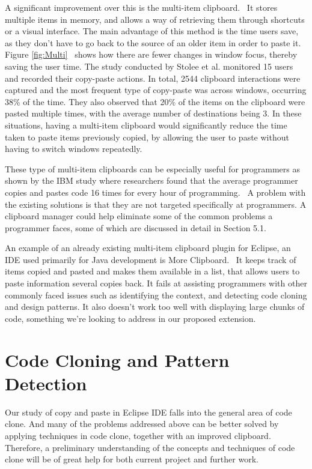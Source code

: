 \documentclass{acm_proc_article-sp}
\begin{document}
A significant improvement over this is the multi-item clipboard.~\cite{cpHabits} It stores multiple items in memory, and allows a way of retrieving them through shortcuts or a visual interface. The main advantage of this method is the time users save, as they don't have to go back to the source of an older item in order to paste it. Figure \ref{fig:Multi}~\cite{cpHabits} shows how there are fewer changes in window focus, thereby saving the user time. The study conducted by Stolee et al. monitored 15 users and recorded their copy-paste actions. In total, 2544 clipboard interactions were captured and the most frequent type of copy-paste was across windows, occurring 38\% of the time. They also observed that 20\% of the items on the clipboard were pasted multiple times, with the average number of destinations being 3. In these situations, having a multi-item clipboard would significantly reduce the time taken to paste items previously copied, by allowing the user to paste without having to switch windows repeatedly.

These type of multi-item clipboards can be especially useful for programmers as shown by the IBM study where researchers found that the average programmer copies and pastes code 16 times for every hour of programming.~\cite{ooplCP} A problem with the existing solutions is that they are not targeted specifically at programmers. A clipboard manager could help eliminate some of the common problems a programmer faces, some of which are discussed in detail in Section 5.1.

An example of an already existing multi-item clipboard plugin for Eclipse, an IDE used primarily for Java development is More Clipboard.~\cite{moreclipboard} It keeps track of items copied and pasted and makes them available in a list, that allows users to paste information several copies back. It fails at assisting programmers with other commonly faced issues such as identifying the context, and detecting code cloning and design patterns. It also doesn't work too well with displaying large chunks of code, something we're looking to address in our proposed extension.

\section{Code Cloning and Pattern Detection}
Our study of copy and paste in Eclipse IDE falls into the general area of code clone. And many of the problems addressed above can be better solved by applying techniques in code clone, together with an improved clipboard. Therefore, a preliminary understanding of the concepts and techniques of code clone will be of great help for both current project and further work. 
\end{document}
